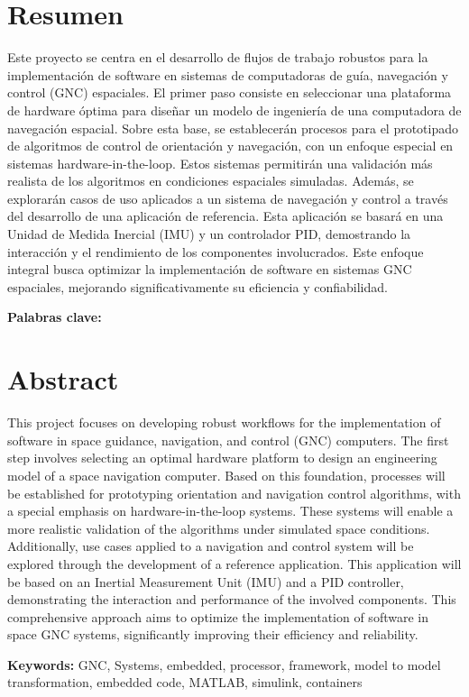 \chapter*{Resumen}
\thispagestyle{empty}

Este proyecto se centra en el desarrollo de flujos de trabajo robustos para la implementación de software en sistemas de computadoras de guía, navegación y control (GNC) espaciales. El primer paso consiste en seleccionar una plataforma de hardware óptima para diseñar un modelo de ingeniería de una computadora de navegación espacial. Sobre esta base, se establecerán procesos para el prototipado de algoritmos de control de orientación y navegación, con un enfoque especial en sistemas hardware-in-the-loop. Estos sistemas permitirán una validación más realista de los algoritmos en condiciones espaciales simuladas.
Además, se explorarán casos de uso aplicados a un sistema de navegación y control a través del desarrollo de una aplicación de referencia. Esta aplicación se basará en una Unidad de Medida Inercial (IMU) y un controlador PID, demostrando la interacción y el rendimiento de los componentes involucrados. Este enfoque integral busca optimizar la implementación de software en sistemas GNC espaciales, mejorando significativamente su eficiencia y confiabilidad.

\bigskip

\textbf{Palabras clave:} \thesisKeywords

\clearpage
\chapter*{Abstract}
\thispagestyle{empty}

This project focuses on developing robust workflows for the implementation of software in space guidance, navigation, and control (GNC) computers. The first step involves selecting an optimal hardware platform to design an engineering model of a space navigation computer. Based on this foundation, processes will be established for prototyping orientation and navigation control algorithms, with a special emphasis on hardware-in-the-loop systems. These systems will enable a more realistic validation of the algorithms under simulated space conditions.
Additionally, use cases applied to a navigation and control system will be explored through the development of a reference application. This application will be based on an Inertial Measurement Unit (IMU) and a PID controller, demonstrating the interaction and performance of the involved components. This comprehensive approach aims to optimize the implementation of software in space GNC systems, significantly improving their efficiency and reliability.

\bigskip

\textbf{Keywords:} GNC, Systems, embedded, processor, framework, model to model transformation, embedded code, MATLAB, simulink, containers

\cleardoublepage

